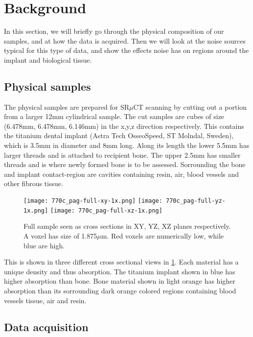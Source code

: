 \section{Background}
\label{sec:background}

In this section, we will briefly go through the physical composition of our samples, and at how
the data is acquired. Then we will look at the noise sources typical for this type of data, and
show the effects noise has on regions around the implant and biological tissue.

\subsection{Physical samples}

The physical samples are prepared for SR$\mu$CT scanning by cutting out a portion from a larger
12mm cylindrical sample. The cut samples are cubes of size
(6.478mm, 6.478mm, 6.146mm) in the x,y,z direction respectively. This contains the titanium dental
implant (Astra Tech OsseoSpeed, ST Molndal, Sweden), which is 3.5mm in diameter and 8mm long. Along
its length the lower 5.5mm has larger threads and is attached to recipient bone. The upper 2.5mm
has smaller threads and is where newly formed bone is to be assessed. Sorrounding the bone and
implant contact-region are cavities containing resin, air, blood vessels and other fibrous tissue.

\begin{figure}
\centering
\texttt{[image: 770c\_pag-full-xy-1x.png]}
\texttt{[image: 770c\_pag-full-yz-1x.png]}
\texttt{[image: 770c\_pag-full-xz-1x.png]}
\caption{Full sample seen as cross sections in XY, YZ, XZ planes respectively. A voxel has size of
1.875$\mu$m. Red voxels are numerically low, while blue are high.}
\label{fig:3viewsample}
\end{figure}

This is shown in three different cross sectional views
in \cref{fig:3viewsample}. Each material has a unique density and thus absorption. The titanium
implant shown in blue has higher absorption than bone. Bone material shown in light orange has
higher absorption than its sorrounding dark orange colored regions containing blood vessels
tissue, air and resin.

\subsection{Data acquisition}

